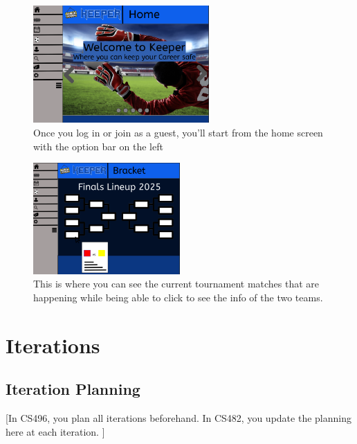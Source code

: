\documentclass{article}
\begin{document}
\begin{figure}[h]
    \centering
    \includegraphics[width=0.6\textwidth]{images/Homescreen.png}
    \caption{Once you log in or join as a guest, you'll start from the home screen with the option bar on the left}
\end{figure}

\begin{figure}[]
    \centering
    \includegraphics[width=0.5\textwidth]{images/Bracket.png}
    \caption{This is where you can see the current tournament matches that are happening while being able to click to see the info of the two teams.}
\end{figure}


\section{Iterations}

\subsection{Iteration Planning}
[In CS496, you plan all iterations beforehand. In CS482, you update the planning here at each iteration. ]
\end{document}
